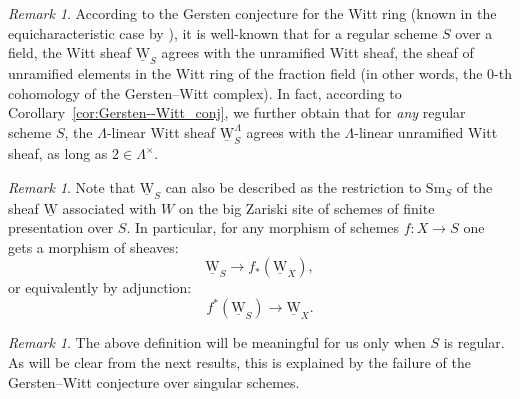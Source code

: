\documentclass[JEP,XML,SOM,Unicode]{cedram}
\newcommand{\uW}{\underline{\mathrm W}}
\newcommand{\sm}{\mathrm{Sm}}
\theoremstyle{remark}
\newtheorem{rem}[thm]{Remark}
\theoremstyle{definition}
\numberwithin{equation}{thm}
\begin{document}
\begin{rem}\label{rem:terminology_unramified_Witt}
According to the Gersten conjecture for the Witt ring
(known in the equicharacteristic case by \cite{BalmerGillePaninWalter}),
it is well-known that for a regular scheme $S$ over a field,
the Witt sheaf $\uW_S$ agrees with the unramified Witt sheaf, \ie the sheaf of unramified elements in the Witt ring of the fraction field (in other words, the $0$-th cohomology of the Gersten--Witt complex).
In fact, according to Corollary~\ref{cor:Gersten--Witt_conj},
we further obtain that for \emph{any} regular scheme $S$,
the $\Lambda$-linear Witt sheaf $\uW_S^\Lambda$ agrees with the $\Lambda$-linear unramified Witt sheaf, as long as $2\in \Lambda^\times$.
\end{rem}

\begin{rem}
Note that $\uW_S$ can also be described as the restriction to $\sm_S$ of the sheaf $\uW$ associated with $W$ on the big Zariski site of schemes of finite presentation over $S$.
In particular, for any morphism of schemes $f:X \to S$ one gets a morphism of sheaves:
\begin{equation}\label{eq:funct1_uW}
\uW_S \to f_*(\uW_X),
\end{equation}
or equivalently by adjunction:
\begin{equation}\label{eq:funct2_uW}
f^*(\uW_S) \to \uW_X.
\end{equation}
\end{rem}

\begin{rem}\label{rem:W_S singular}
The above definition will be meaningful for us only when $S$ is regular.
As will be clear from the next results, this is explained by the failure of the Gersten--Witt conjecture over singular schemes.
\end{rem}
\end{document}
